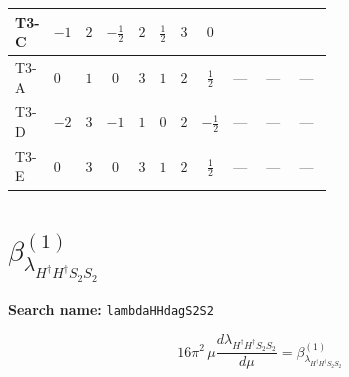 \documentclass[8pt]{article}
\begin{document}
\begin{landscape}
\begin{longtable}{@{}llcccccc >{\raggedright\arraybackslash}p{0.21\linewidth} >{\raggedright\arraybackslash}p{0.21\linewidth} >{\raggedright\arraybackslash}p{0.21\linewidth}@{}}
\midrule
T3-C & $-1$ & $2$ & $-\frac{1}{2}$ & $2$ & $\frac{1}{2}$ & $3$ & $0$ & \scriptsize\adjustbox{max width=\linewidth}{$\begin{gathered} +{\lambda_{H2}} (4 {\lambda_{H H^\dagger S_1^\dagger S_2^\dagger}^{\rm Cross}}+3 {\lambda_{S_1^\dagger S_2 S_2^{\dagger 2}}})\end{gathered}$} & \scriptsize\adjustbox{max width=\linewidth}{$\begin{gathered} +{\lambda_{H2}^{\rm Adj}} \left(-\frac{3 {\lambda_{H H^\dagger S_1^\dagger S_2^\dagger}^{\rm Cross}}}{2}-\frac{3 {\lambda_{S_1^\dagger S_2 S_2^{\dagger 2}}}}{4}\right)\end{gathered}$} & \scriptsize\adjustbox{max width=\linewidth}{$\begin{gathered} -6 {\lambda_{H^\dagger H^\dagger S_1^\dagger S_1^\dagger}} {\lambda_{T3}}\end{gathered}$} \\
\midrule
T3-A & $0$ & $1$ & $0$ & $3$ & $1$ & $2$ & $\frac{1}{2}$ & --- & --- & --- \\
\midrule
T3-D & $-2$ & $3$ & $-1$ & $1$ & $0$ & $2$ & $-\frac{1}{2}$ & --- & --- & --- \\
\midrule
T3-E & $0$ & $3$ & $0$ & $3$ & $1$ & $2$ & $\frac{1}{2}$ & --- & --- & --- \\
\midrule
\bottomrule
\end{longtable}
\clearpage
\section*{$\beta_{\lambda_{H^\dagger H^\dagger S_2 S_2}}^{(1)}$}
\noindent\textbf{Search name: }\texttt{lambdaHHdagS2S2}\par\smallskip
\[16\pi^2\,\mu\frac{d \lambda_{H^\dagger H^\dagger S_2 S_2}}{d\mu}=\beta_{\lambda_{H^\dagger H^\dagger S_2 S_2}}^{(1)}\]

\end{landscape}
\end{document}
